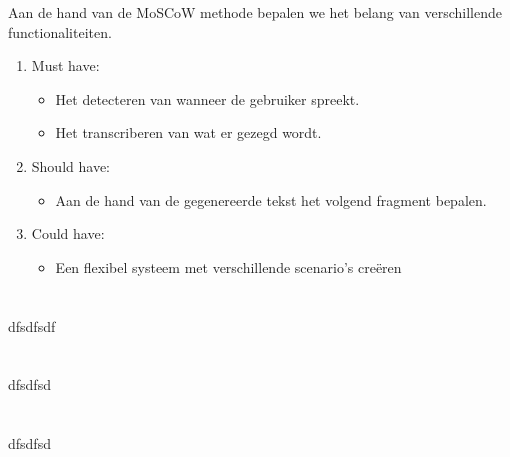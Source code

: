 Aan de hand van de MoSCoW methode bepalen we het belang van verschillende functionaliteiten.

\begin{enumerate}
    \item Must have:
    \begin{itemize}
        \item Het detecteren van wanneer de gebruiker spreekt.
        \item Het transcriberen van wat er gezegd wordt.
    \end{itemize}
    \item Should have:
    \begin{itemize}
        \item Aan de hand van de gegenereerde tekst het volgend fragment bepalen.
    \end{itemize}
    \item Could have:
    \begin{itemize}
        \item Een flexibel systeem met verschillende scenario’s creëren
    \end{itemize}
\end{enumerate}

\subsection{}%



\section{} \label{sect:Speech to text}%

dfsdfsdf


\section{} \label{sect:Language models}%

dfsdfsd


\section{} \label{sect:Proof-of-concept}%

dfsdfsd